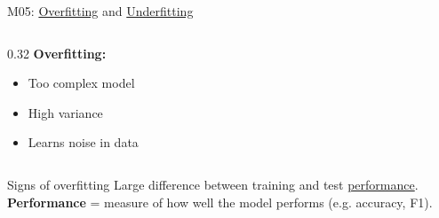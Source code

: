 \documentclass[aspectratio=169, 10pt]{beamer}
\begin{document}
\begin{frame}{M05: \href{https://en.wikipedia.org/wiki/Overfitting}{Overfitting} and \href{https://en.wikipedia.org/wiki/Overfitting\#Underfitting}{Underfitting}}
\begin{columns}
        \begin{column}{0.32\textwidth}
            \textbf{Overfitting:}
            \begin{itemize}
                \item Too complex model
                \item High variance
                \item Learns noise in data
            \end{itemize}
            \begin{center}
            \end{center}
        \end{column}
    \end{columns}

    \vspace{3mm}
    \begin{block}{\footnotesize Signs of overfitting}
        \footnotesize Large difference between training and test \href{https://en.wikipedia.org/wiki/Evaluation_of_machine_learning_models}{performance}. \textbf{Performance} = measure of how well the model performs (e.g. accuracy, F1).
    \end{block}

\end{frame}
\end{document}
